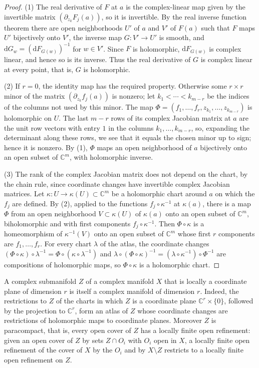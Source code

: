 \begin{proof}
(1) The real derivative of $F$ at $a$ is the complex-linear map given by the invertible matrix $(\partial_{z_k}F_j(a))$, so it is invertible. By the real inverse function theorem there are open neighborhoods $U'$ of $a$ and $V'$ of $F(a)$ such that $F$ maps $U'$ bijectively onto $V'$, the inverse map $G\colon V'\to U'$ is smooth, and $\mathrm dG_w=(\mathrm dF_{G(w)})^{-1}$ for $w\in V'$. Since $F$ is holomorphic, $\mathrm dF_{G(w)}$ is complex linear, and hence so is its inverse. Thus the real derivative of $G$ is complex linear at every point, that is, $G$ is holomorphic.

(2) If $r=0$, the identity map has the required property. Otherwise some $r\times r$ minor of the matrix $(\partial_{z_k}f_j(a))$ is nonzero; let $k_1<\cdots<k_{m-r}$ be the indices of the columns not used by this minor. The map $\Phi=(f_1,\ldots,f_r,z_{k_1},\ldots,z_{k_{m-r}})$ is holomorphic on $U$. The last $m-r$ rows of its complex Jacobian matrix at $a$ are the unit row vectors with entry $1$ in the columns $k_1,\ldots,k_{m-r}$, so, expanding the determinant along these rows, we see that it equals the chosen minor up to sign; hence it is nonzero. By (1), $\Phi$ maps an open neighborhood of $a$ bijectively onto an open subset of $\mathbb C^m$, with holomorphic inverse.

(3) The rank of the complex Jacobian matrix does not depend on the chart, by the chain rule, since coordinate changes have invertible complex Jacobian matrices. Let $\kappa\colon U\to\kappa(U)\subset\mathbb C^m$ be a holomorphic chart around $a$ on which the $f_j$ are defined. By (2), applied to the functions $f_j\circ\kappa^{-1}$ at $\kappa(a)$, there is a map $\Phi$ from an open neighborhood $V\subset\kappa(U)$ of $\kappa(a)$ onto an open subset of $\mathbb C^m$, biholomorphic and with first components $f_j\circ\kappa^{-1}$. Then $\Phi\circ\kappa$ is a homeomorphism of $\kappa^{-1}(V)$ onto an open subset of $\mathbb C^m$ whose first $r$ components are $f_1,\ldots,f_r$. For every chart $\lambda$ of the atlas, the coordinate changes $(\Phi\circ\kappa)\circ\lambda^{-1}=\Phi\circ(\kappa\circ\lambda^{-1})$ and $\lambda\circ(\Phi\circ\kappa)^{-1}=(\lambda\circ\kappa^{-1})\circ\Phi^{-1}$ are compositions of holomorphic maps, so $\Phi\circ\kappa$ is a holomorphic chart.
\end{proof}

A complex submanifold $Z$ of a complex manifold $X$ that is locally a coordinate plane of dimension $r$ is itself a complex manifold of dimension $r$. Indeed, the restrictions to $Z$ of the charts in which $Z$ is a coordinate plane $\mathbb C^r\times\{0\}$, followed by the projection to $\mathbb C^r$, form an atlas of $Z$ whose coordinate changes are restrictions of holomorphic maps to coordinate planes. Moreover $Z$ is paracompact, that is, every open cover of $Z$ has a locally finite open refinement: given an open cover of $Z$ by sets $Z\cap O_i$ with $O_i$ open in $X$, a locally finite open refinement of the cover of $X$ by the $O_i$ and by $X\setminus Z$ restricts to a locally finite open refinement on $Z$.

